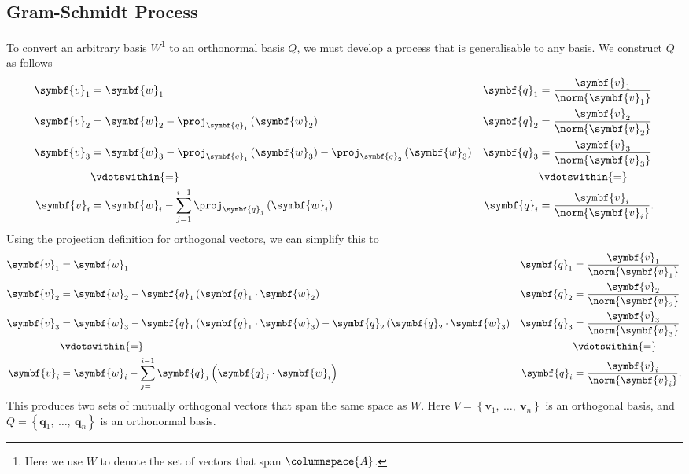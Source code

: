 \documentclass{article}
\begin{document}
\subsection{Gram-Schmidt Process}
To convert an arbitrary basis \(W\)\footnote{Here we use \(W\) to
denote the set of vectors that span \(\columnspace{A}\).} to an
orthonormal basis \(Q\), we must develop a process that is
generalisable to any basis.
We construct \(Q\) as follows
\begin{align*}
    \symbf{v}_1 & = \symbf{w}_1                                                                                                   & \symbf{q}_1 & = \frac{\symbf{v}_1}{\norm{\symbf{v}_1}}  \\
    \symbf{v}_2 & = \symbf{w}_2 - \proj_{\symbf{q}_1} \left( \symbf{w}_2 \right)                                                  & \symbf{q}_2 & = \frac{\symbf{v}_2}{\norm{\symbf{v}_2}}  \\
    \symbf{v}_3 & = \symbf{w}_3 - \proj_{\symbf{q}_1} \left( \symbf{w}_3 \right) - \proj_{\symbf{q}_2} \left( \symbf{w}_3 \right) & \symbf{q}_3 & = \frac{\symbf{v}_3}{\norm{\symbf{v}_3}}  \\
                & \vdotswithin{=}                                                                                                 &             & \vdotswithin{=}                           \\
    \symbf{v}_i & = \symbf{w}_i - \sum_{j = 1}^{i - 1} \proj_{\symbf{q}_j} \left( \symbf{w}_i \right)                             & \symbf{q}_i & = \frac{\symbf{v}_i}{\norm{\symbf{v}_i}}.
\end{align*}
Using the projection definition for orthogonal vectors, we can simplify this to
\begin{align*}
    \symbf{v}_1 & = \symbf{w}_1                                                                                                                       & \symbf{q}_1 & = \frac{\symbf{v}_1}{\norm{\symbf{v}_1}}  \\
    \symbf{v}_2 & = \symbf{w}_2 - \symbf{q}_1 \left( \symbf{q}_1 \cdot \symbf{w}_2 \right)                                                            & \symbf{q}_2 & = \frac{\symbf{v}_2}{\norm{\symbf{v}_2}}  \\
    \symbf{v}_3 & = \symbf{w}_3 - \symbf{q}_1 \left( \symbf{q}_1 \cdot \symbf{w}_3 \right) - \symbf{q}_2 \left( \symbf{q}_2 \cdot \symbf{w}_3 \right) & \symbf{q}_3 & = \frac{\symbf{v}_3}{\norm{\symbf{v}_3}}  \\
                & \vdotswithin{=}                                                                                                                     &             & \vdotswithin{=}                           \\
    \symbf{v}_i & = \symbf{w}_i - \sum_{j = 1}^{i - 1} \symbf{q}_j \left( \symbf{q}_j \cdot \symbf{w}_i \right)                                       & \symbf{q}_i & = \frac{\symbf{v}_i}{\norm{\symbf{v}_i}}.
\end{align*}
This produces two sets of mutually orthogonal vectors that span the same space as \(W\). Here \(V = \left\{ \symbf{v}_1,\: \dots,\: \symbf{v}_n \right\}\) is an orthogonal basis,
and \(Q = \left\{ \symbf{q}_1,\: \dots,\: \symbf{q}_n \right\}\) is an orthonormal basis.
\end{document}
